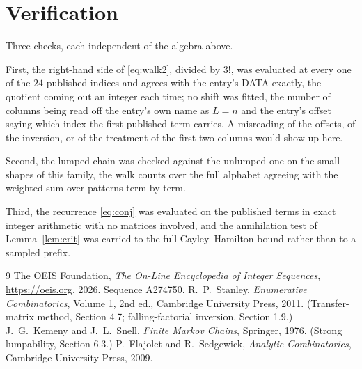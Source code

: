 \documentclass[11pt,a4paper]{article}
\theoremstyle{plain}
\theoremstyle{definition}
\begin{document}
\section{Verification}

Three checks, each independent of the algebra above.

First, the right-hand side of \eqref{eq:walk2}, divided by $3!$, was evaluated at every
one of the $24$ published indices and agrees with the entry's DATA exactly, the quotient
coming out an integer each time; no shift was fitted, the number of columns being read off the
entry's own name as $L=n$ and the entry's offset saying which index the first published
term carries. A misreading of the offsets, of the inversion, or of the treatment of the first
two columns would show up here.

Second, the lumped chain was checked against the unlumped one on the small shapes of this
family, the walk counts over the full alphabet agreeing with the weighted sum over patterns
term by term.

Third, the recurrence \eqref{eq:conj} was evaluated on the published terms in exact integer
arithmetic with no matrices involved, and the annihilation test of Lemma~\ref{lem:crit} was
carried to the full Cayley--Hamilton bound rather than to a sampled prefix.

\begin{thebibliography}{9}
 The OEIS Foundation, \emph{The On-Line Encyclopedia of Integer
Sequences}, \url{https://oeis.org}, 2026. Sequence A274750.
 R.~P.~Stanley, \emph{Enumerative Combinatorics}, Volume 1, 2nd ed.,
Cambridge University Press, 2011. (Transfer-matrix method, Section 4.7; falling-factorial
inversion, Section 1.9.)
 J.~G.~Kemeny and J.~L.~Snell, \emph{Finite Markov Chains}, Springer,
1976. (Strong lumpability, Section 6.3.)
 P.~Flajolet and R.~Sedgewick, \emph{Analytic Combinatorics}, Cambridge
University Press, 2009.
\end{thebibliography}
\end{document}

